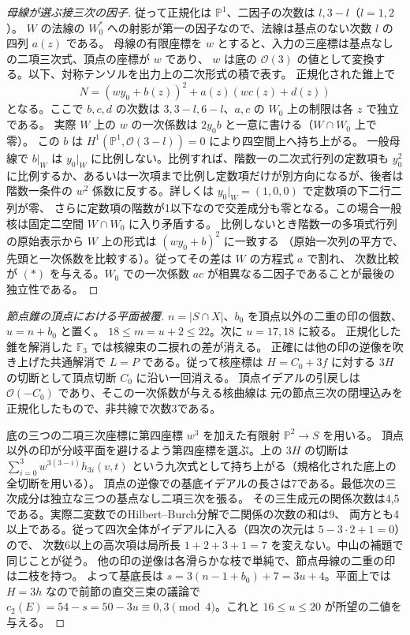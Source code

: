 \begin{proof}[母線が選ぶ接三次の因子]
従って正規化は $\mathbb P^1$、二因子の次数は $l,3-l$（$l=1,2$）。
$W$ の法線の $W_0^*$ への射影が第一の因子なので、法線は基点のない次数 $l$ の四列 $a(z)$ である。
母線の有限座標を $w$ とすると、入力の三座標は基点なしの二項三次式、頂点の座標が $w$ であり、
$w$ は底の $\mathcal O(3)$ の値として変換する。以下、対称テンソルを出力上の二次形式の積で表す。
正規化された錐上で
\[
                 N=(w y_0+b(z))^2+a(z)(w c(z)+d(z))                 \tag{*}
\]
となる。ここで $b,c,d$ の次数は $3,3-l,6-l$、$a,c$ の $W_0$ 上の制限は各 $z$ で独立である。
実際 $W$ 上の $w$ の一次係数は $2y_0 b$ と一意に書ける（$W\cap W_0$ 上で零）。
この $b$ は $H^1(\mathbb P^1,\mathcal O(3-l))=0$ により四空間上へ持ち上がる。
一般母線で $b|_W$ は $y_0|_W$ に比例しない。比例すれば、階数一の二次式行列の定数項も
$y_0^2$ に比例するか、あるいは一次項まで比例し定数項だけが別方向になるが、後者は階数一条件の
$w^2$ 係数に反する。詳しくは $y_0|_W=(1,0,0)$ で定数項の下二行二列が零、
さらに定数項の階数が1以下なので交差成分も零となる。この場合一般核は固定二空間 $W\cap W_0$ に入り矛盾する。
比例しないとき階数一の多項式行列の原始表示から $W$ 上の形式は $(w y_0+b)^2$ に一致する
（原始一次列の平方で、先頭と一次係数を比較する）。従ってその差は $W$ の方程式 $a$ で割れ、
次数比較が $(*)$ を与える。$W_0$ での一次係数 $a c$ が相異なる二因子であることが最後の独立性である。
\end{proof}
\begin{proof}[節点錐の頂点における平面被覆]
$n=|S\cap X|$、$b_0$ を頂点以外の二重の印の個数、$u=n+b_0$ と置く。
$18\le m=u+2\le22$。次に $u=17,18$ に絞る。
正規化した錐を解消した $\mathbb F_3$ では核線束の二捩れの差が消える。
正確には他の印の逆像を吹き上げた共通解消で $L=P$ である。従って核座標は
$H=C_0+3f$ に対する $3H$ の切断として頂点切断 $C_0$ に沿い一回消える。
頂点イデアルの引戻しは $\mathcal O(-C_0)$ であり、そこの一次係数が与える核曲線は
元の節点三次の閉埋込みを正規化したもので、非共線で次数3である。

底の三つの二項三次座標に第四座標 $w^3$ を加えた有限射 $\mathbb P^2\to S$ を用いる。
頂点以外の印が分岐平面を避けるよう第四座標を選ぶ。上の $3H$ の切断は
$\sum_{i=0}^3 w^{3(3-i)}h_{3i}(v,t)$ という九次式として持ち上がる（規格化された底上の全切断を用いる）。
頂点の逆像での基底イデアルの長さは7である。最低次の三次成分は独立な三つの基点なし二項三次を張る。
その三生成元の関係次数は4,5である。実際二変数でのHilbert--Burch分解で二関係の次数の和は9、
両方とも4以上である。従って四次全体がイデアルに入る（四次の次元は $5-3\cdot2+1=0$）ので、
次数6以上の高次項は局所長 $1+2+3+1=7$ を変えない。中山の補題で同じことが従う。
他の印の逆像は各滑らかな枝で単純で、節点母線の二重の印は二枝を持つ。
よって基底長は $s=3(n-1+b_0)+7=3u+4$。平面上では $H=3h$ なので前節の直交三束の議論で
$c_2(E)=54-s=50-3u\equiv0,3\pmod4$。これと $16\le u\le20$ が所望の二値を与える。
\end{proof}
